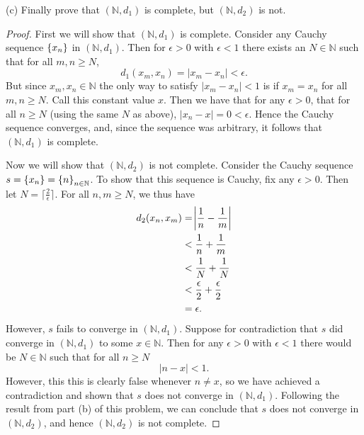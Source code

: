 \documentclass{article}
\newcommand{\N}{\mathbb{N}}
\begin{document}
\newpage

(c) Finally prove that $(\N, d_1)$ is complete, but $(\N, d_2)$ is not.

\begin{proof}

First we will show that $(\N, d_1)$ is complete. Consider any Cauchy
sequence $\cbr{x_n}$ in $(\N, d_1)$. Then for $\epsilon > 0$ with
$\epsilon < 1$ there exists an $N \in \N$ such that for all $m, n \geq
N$,
%
\begin{equation*}
    d_1(x_m, x_n) = |x_m - x_n| < \epsilon
    .
\end{equation*}
%
But since $x_m, x_n \in \N$ the only way to satisfy $|x_m - x_n| < 1$ is
if $x_m = x_n$ for all $m, n \geq N$. Call this constant value $x$. Then
we have that for any $\epsilon > 0$, that for all $n \geq N$ (using the
same $N$ as above), $|x_n - x| = 0 < \epsilon$. Hence the Cauchy
sequence converges, and, since the sequence was arbitrary, it follows
that $(\N, d_1)$ is complete.

Now we will show that $(\N, d_2)$ is not complete. Consider the Cauchy
sequence $s = \cbr{x_n} = \cbr{n}_{n \in \N}$. To show that this
sequence is Cauchy, fix any $\epsilon > 0$. Then let $N = \lceil
\frac{2}{\epsilon} \rceil$. For all $n, m \geq N$, we thus have
%
\begin{align*}
    d_2(x_n, x_m)
        &= \envert{ \frac{1}{n} - \frac{1}{m} } \\
        &< \frac{1}{n} + \frac{1}{m} \\
        &< \frac{1}{N} + \frac{1}{N} \\
        &< \frac{\epsilon}{2} + \frac{\epsilon}{2} \\
        &= \epsilon
        .
\end{align*}
%
However, $s$ fails to converge in $(\N, d_1)$. Suppose for contradiction
that $s$ did converge in $(\N, d_1)$ to some $x \in \N$. Then for any
$\epsilon > 0$ with $\epsilon < 1$ there would be $N \in \N$ such that
for all $n \geq N$
%
\begin{equation*}
    |n - x| < 1
    .
\end{equation*}
%
However, this this is clearly false whenever $n \neq x$, so we have
achieved a contradiction and shown that $s$ does not converge in $(\N,
d_1)$. Following the result from part (b) of this problem, we can
conclude that $s$ does not converge in $(\N, d_2)$, and hence $(\N,
d_2)$ is not complete.

\end{proof}
\end{document}
